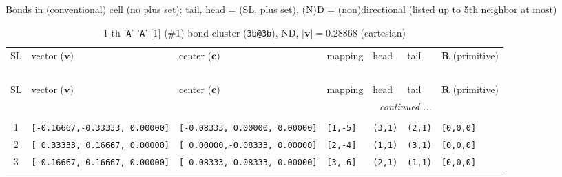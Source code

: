 \documentclass[fleqn,10pt,landscape]{jsarticle}
\begin{document}
\noindent Bonds in (conventional) cell (no plus set): tail, head = (SL, plus set), (N)D = (non)directional (listed up to 5th neighbor at most)

\renewcommand{\arraystretch}{1.6}
\begin{longtable}[l]{cllllll}
\captionsetup{justification=raggedright, singlelinecheck=off}
\caption{1-th '\texttt{A}'-'\texttt{A}' [1] (\#1) bond cluster (\texttt{3b@3b}), ND, $|\bm{v}|=0.28868$ (cartesian)}
 \\
 \hline \hline
SL & vector ($\bm{v})$ & center ($\bm{c})$ & mapping & head & tail & $\bm{R}$ (primitive) \\ \hline \endfirsthead

\multicolumn{6}{l}{\tablename\ \thetable{}} \\
 \hline \hline
SL & vector ($\bm{v})$ & center ($\bm{c})$ & mapping & head & tail & $\bm{R}$ (primitive) \\ \hline \endhead

 \hline \hline
\multicolumn{6}{r}{\footnotesize\it continued ...} \\ \endfoot

 \hline \hline
\multicolumn{6}{r}{} \\ \endlastfoot

1 & \texttt{[-0.16667,-0.33333, 0.00000]} & \texttt{[-0.08333, 0.00000, 0.00000]} & \texttt{[1,-5]} & \texttt{(3,1)} & \texttt{(2,1)} & \texttt{[0,0,0]} \\ \hline
2 & \texttt{[ 0.33333, 0.16667, 0.00000]} & \texttt{[ 0.00000,-0.08333, 0.00000]} & \texttt{[2,-4]} & \texttt{(1,1)} & \texttt{(3,1)} & \texttt{[0,0,0]} \\ \hline
3 & \texttt{[-0.16667, 0.16667, 0.00000]} & \texttt{[ 0.08333, 0.08333, 0.00000]} & \texttt{[3,-6]} & \texttt{(2,1)} & \texttt{(1,1)} & \texttt{[0,0,0]} \\
\end{longtable}
\renewcommand{\arraystretch}{1.6}
\end{document}
